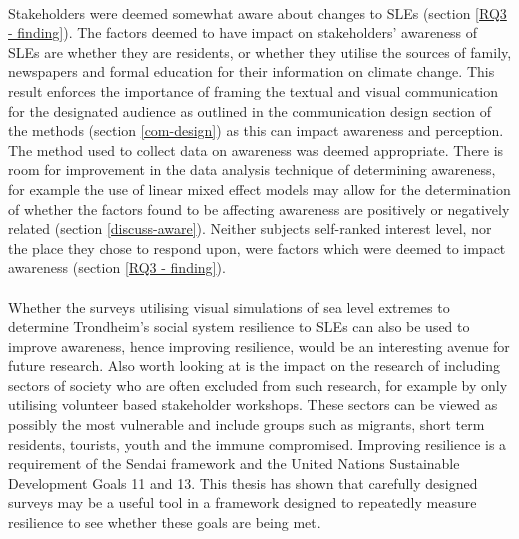 \paragraph{}
Stakeholders were deemed somewhat aware about changes to SLEs (section \ref{RQ3 - finding}). The factors deemed to have impact on stakeholders' awareness of SLEs are whether they are residents, or whether they utilise the sources of family, newspapers and formal education for their information on climate change. This result enforces the importance of framing the textual and visual communication for the designated audience as outlined in the communication design section of the methods (section \ref{com-design}) as this can impact awareness and perception.  The method used to collect data on awareness was deemed appropriate. There is room for improvement in the data analysis technique of determining awareness, for example the use of linear mixed effect models may allow for the determination of whether the factors found to be affecting awareness are positively or negatively related (section \ref{discuss-aware}). Neither subjects self-ranked interest level, nor the place they chose to respond upon, were factors which were deemed to impact awareness (section \ref{RQ3 - finding}).
\paragraph{}



Whether the surveys utilising visual simulations of sea level extremes to determine Trondheim's social system resilience to SLEs can also be used to improve awareness, hence improving resilience, would be an interesting avenue for future research. Also worth looking at is the impact on the research of including sectors of society who are often excluded from such research, for example by only utilising volunteer based stakeholder workshops. These sectors can be viewed as possibly the most vulnerable and include groups such as migrants, short term residents, tourists, youth and the immune compromised. Improving resilience is a requirement of the Sendai framework and the United Nations Sustainable Development Goals 11 and 13. This thesis has shown that carefully designed surveys may be a useful tool in a framework designed to repeatedly measure resilience to see whether these goals are being met.


